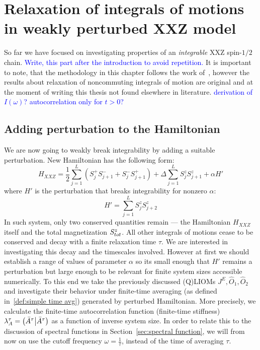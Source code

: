\chapter{Relaxation of integrals of motions in weakly perturbed XXZ model}
\thispagestyle{chapterBeginStyle}

So far we have focused on investigating properties of an \textit{integrable} XXZ
spin-\(1/2\) chain.
\textcolor{blue}{Write, this part after the introduction to avoid repetition.}
It is important to note, that the methodology in this chapter follows the work
of~\textcite{Mierzejewski2015Approx}, however the results about relaxation of noncommuting integrals
of motion are original and at the moment of writing this thesis not found elsewhere
in literature. 
\textcolor{blue}{derivation of \(I(\omega)\)? autocorrelation only for \(t>0\)?}
\section{Adding perturbation to the Hamiltonian}
We are now going to weakly break integrability by adding a suitable perturbation.
New Hamiltonian has the following form:
\begin{equation}
    H_{XXZ} = \frac{1}{2}\sum_{j = 1}^{L}\left( S^{+}_{j} S^{-}_{j+1} + 
    S^{-}_{j}S^{+}_{j+1} \right) + \Delta\sum_{j = 1}^{L} S^{z}_{j}S^{z}_{j+1}
    + \alpha H'
    \label{eq:HXXZ perturbed}
\end{equation}
where \(H'\) is the perturbation that breaks integrability for nonzero \(\alpha \):
\begin{equation}
    H'=\sum_{j = 1}^{L} S^{z}_{j}S^{z}_{j+2}
    \label{eq:perturbation}
\end{equation}
In such system, only two conserved quantities remain --- the Hamiltonian \(H_{XXZ}\) itself 
and the total magnetization \(S^{z}_{tot}\). All other integrals of motions cease to be conserved
and decay with a finite relaxation time \(\tau\). We are interested in investigating this
decay and the timescales involved. However at first we should establish a range of
values of parameter \(\alpha\) so its small enough that \(H'\) remains a perturbation
but large enough to be relevant for finite system sizes accessible numerically. 
To this end we take the previously discussed (Q)LIOMs  \(J^E, \hat{O}_1,\hat{O}_2\)
and investigate their behavior under finite-time averaging (as defined in~\eqref{def:simple time avg})
generated by perturbed Hamiltonian. More precisely, we calculate the finite-time autocorrelation
function (finite-time stiffness) \(\lambda^{\tau}_A = \left(\bar{A}^{\tau} \middle| \bar{A}^{\tau}\right)\) as
a function of inverse system size.
In order to relate this to the discussion of spectral functions in Section~\ref{sec:spectral function},
we will from now on use the cutoff frequency \(\omega = \frac{1}{\tau}\), instead of the time of
averaging \(\tau\). 

